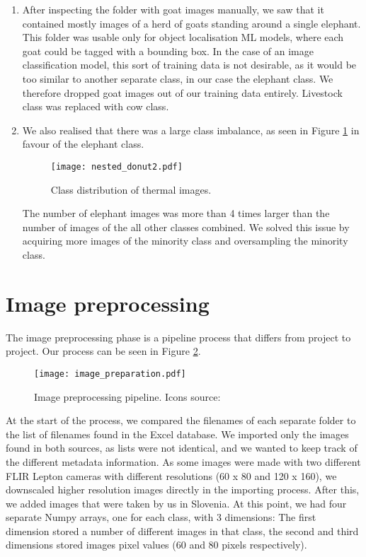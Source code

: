 \begin{enumerate}
    \item After inspecting the folder with goat images manually, we saw that it contained mostly images of a herd of goats standing around a single elephant.
This folder was usable only for object localisation ML models, where each goat could be tagged with a bounding box. 
In the case of an image classification model, this sort of training data is not desirable, as it would be too similar to another separate class, in our case the elephant class.
We therefore dropped goat images out of our training data entirely.
Livestock class was replaced with cow class.

    \item We also realised that there was a large class imbalance, as seen in Figure \ref{nested_donut2} in favour of the elephant class.

\begin{figure}[ht]
    \centering
    \texttt{[image: nested\_donut2.pdf]} 
    \caption{Class distribution of thermal images.}
    \label{nested_donut2}
\end{figure}

The number of elephant images was more than 4 times larger than the number of images of the all other classes combined.
We solved this issue by acquiring more images of the minority class and oversampling the minority class.
\end{enumerate}


\section{ Image preprocessing}

The image preprocessing phase is a pipeline process that differs from project to project.
Our process can be seen in Figure \ref{image_preparation}.

\begin{figure}[ht]
    \centering
    \texttt{[image: image\_preparation.pdf]} 
    \caption[Image preprocessing pipeline.]{Image preprocessing pipeline. Icons source:\cite{icons}}
    \label{image_preparation}
\end{figure}

At the start of the process, we compared the filenames of each separate folder to the list of filenames found in the Excel database.
We imported only the images found in both sources, as lists were not identical, and we wanted to keep track of the different metadata information.
As some images were made with two different FLIR Lepton cameras with different resolutions (60 x 80 and 120 x 160), we downscaled higher resolution images directly in the importing process.
After this, we added images that were taken by us in Slovenia.
At this point, we had four separate Numpy arrays, one for each class, with 3 dimensions: The first dimension stored a number of different images in that class, the second and third dimensions stored images pixel values (60 and 80 pixels respectively).

